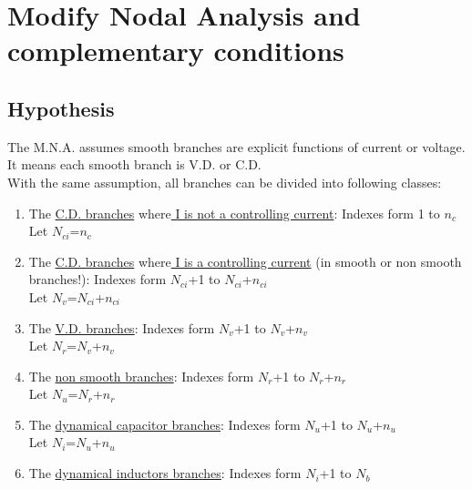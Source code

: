 \documentclass[10pt]{article}
\begin{document}
\section{Modify Nodal Analysis and complementary conditions}
\subsection{Hypothesis\\}
The M.N.A. assumes smooth branches are explicit functions of current or voltage. It means each smooth
branch is V.D. or C.D.\\

With the same assumption, all branches can be divided into following classes:\\
\begin{enumerate}
\item The  \underline{C.D. branches} where\underline{ I is not a controlling current}: Indexes form 1 to $n_{c}$\\
  Let $N_{ci}$=$n_{c}$
\item The  \underline{C.D.  branches} where\underline{ I is a controlling current} (in smooth or non smooth branches!): Indexes form $N_{ci}$+1 to $N_{ci}$+$n_{ci}$\\
  Let $N_{v}$=$N_{ci}$+$n_{ci}$
\item The  \underline{V.D. branches}: Indexes form $N_{v}$+1 to $N_{v}$+$n_{v}$ \\
  Let $N_{r}$=$N_{v}$+$n_{v}$
 \item The  \underline{non smooth branches}: Indexes form $N_{r}$+1 to $N_{r}$+$n_{r}$\\
  Let $N_{u}$=$N_{r}$+$n_{r}$
 \item The \underline{dynamical capacitor branches}: Indexes form $N_{u}$+1 to $N_{u}$+$n_{u}$\\
  Let $N_{i}$=$N_{u}$+$n_{u}$
 \item The \underline{dynamical inductors branches}: Indexes form $N_{i}$+1 to $N_{b}$ \\
\end{enumerate}


\newpage
\end{document}
